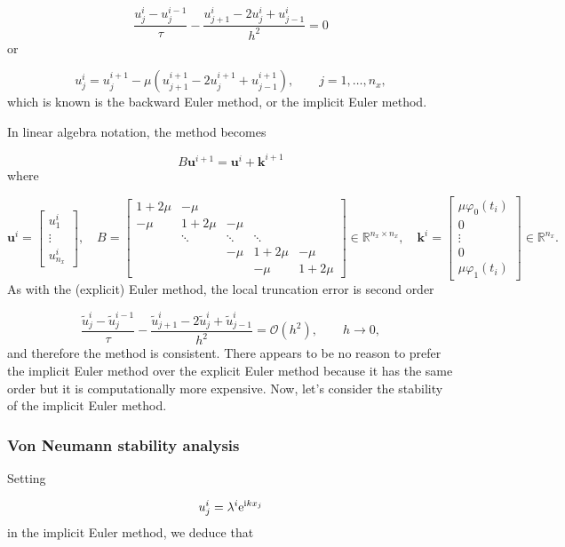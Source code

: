 \documentclass[12pt,a4paper]{article}
\begin{document}
\[
\frac{u^{i}_j - u^{i-1}_j}{\tau} - \frac{u^{i}_{j+1} - 2u^i_j + u^i_{j-1}}{h^2} = 0
\]
or

\[
u^{i}_j = u^{i+1}_j - \mu \left( u^{i+1}_{j+1} - 2u^{i+1}_j + u^{i+1}_{j-1}  \right), \qquad j = 1, \ldots, n_x,
\]
which is known is the backward Euler method, or the implicit Euler method.

In linear algebra notation, the method becomes

\[
B\mathbf{u}^{i+1} = \mathbf{u}^i + \mathbf{k}^{i+1}
\]
where

\[
\mathbf{u}^i = \begin{bmatrix}
u^{i}_{1} \\
\vdots \\
u^{i}_{n_x}
\end{bmatrix}, \quad  B = \begin{bmatrix}
1 + 2\mu & -\mu & & & \\
-\mu  & 1+2\mu & -\mu  & & \\
      & \ddots & \ddots & \ddots & \\
      &        & -\mu    & 1+ 2\mu & -\mu \\
      &        &        &-\mu      & 1+2\mu
\end{bmatrix} \in \mathbb{R}^{n_x \times n_x}, \quad \mathbf{k}^i=
\begin{bmatrix}
\mu\varphi_0(t_i) \\
0 \\
\vdots \\
0 \\
\mu \varphi_1(t_i)
\end{bmatrix} \in \mathbb{R}^{n_x}.
\]
As with the (explicit) Euler method, the local truncation error is second order

\[
\frac{\tilde{u}^{i}_j - \tilde{u}^{i-1}_j}{\tau} - \frac{\tilde{u}^{i}_{j+1} - 2\tilde{u}^i_j + \tilde{u}^i_{j-1}}{h^2} =  \mathcal{O}(h^2), \qquad h \to 0,
\]
and therefore the method is consistent.  There appears to be no reason to prefer the implicit Euler method over the explicit Euler method because it has the same order but it is computationally more expensive.   Now, let's consider the stability of the implicit Euler method. 

\subsubsection{Von Neumann stability analysis}
Setting

\[
u^i_j = \lambda^i{\rm e}^{{\rm i}k x_j}
\]
in the implicit Euler method, we deduce that
\end{document}
